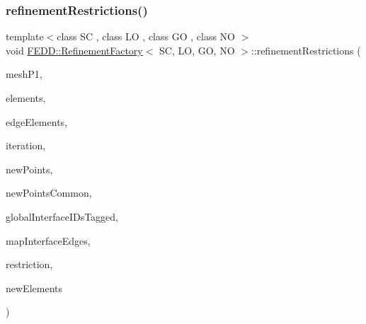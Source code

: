 \mbox{\label{classFEDD_1_1RefinementFactory_a6fa94c91b750950e2bbe53c3540eda08}} 
\subsubsection{\texorpdfstring{refinement\+Restrictions()}{refinementRestrictions()}}
{\footnotesize\ttfamily template$<$class SC , class LO , class GO , class NO $>$ \\
void \hyperlink{classFEDD_1_1RefinementFactory}{F\+E\+D\+D\+::\+Refinement\+Factory}$<$ SC, LO, GO, NO $>$\+::refinement\+Restrictions (\begin{DoxyParamCaption}\item[{\hyperlink{classFEDD_1_1RefinementFactory_a1a278d01c278972af01f2996247af8ac}{Mesh\+Unstr\+Ptr\+\_\+\+Type}}]{mesh\+P1,  }\item[{\hyperlink{classFEDD_1_1RefinementFactory_a0994b5b7b6d080048673941251999f2e}{Elements\+Ptr\+\_\+\+Type}}]{elements,  }\item[{\hyperlink{classFEDD_1_1RefinementFactory_ae5285e990ec4632d6188a1280627ad13}{Edge\+Elements\+Ptr\+\_\+\+Type}}]{edge\+Elements,  }\item[{int}]{iteration,  }\item[{int \&}]{new\+Points,  }\item[{int \&}]{new\+Points\+Common,  }\item[{vec\+\_\+\+G\+O\+\_\+\+Type \&}]{global\+Interface\+I\+Ds\+Tagged,  }\item[{\hyperlink{classFEDD_1_1RefinementFactory_a8256ccdf1b2a5c977ddc011f4e8eb8d3}{Map\+Const\+Ptr\+\_\+\+Type}}]{map\+Interface\+Edges,  }\item[{string}]{restriction,  }\item[{int \&}]{new\+Elements }\end{DoxyParamCaption})}

\mbox{\label{classFEDD_1_1RefinementFactory_afeed9a01eee8623f5136e07449f3f35d}} 
